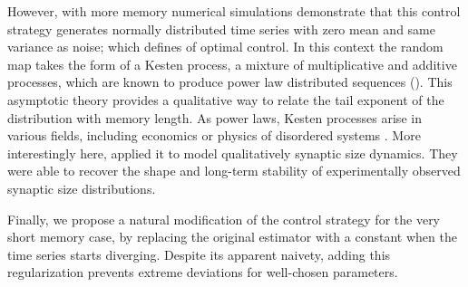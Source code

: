\documentclass[FinalReport.tex]{subfiles}
\begin{document}
However, with more memory numerical simulations demonstrate that this control strategy generates normally distributed time series with zero mean and same variance as noise; which defines of optimal control. In this context the random map takes the form of a Kesten process, a mixture of multiplicative and additive processes, which are known to produce power law distributed sequences (\citet{kesten}). This asymptotic theory provides a qualitative way to relate the tail exponent of the distribution with memory length. As power laws, Kesten processes arise in various fields, including economics \cite{kesten-econ} or physics of disordered systems \cite{kesten-process-physics}. More interestingly here, \citet{kesten-synapses} applied it to model qualitatively synaptic size dynamics. They were able to recover the shape and long-term stability of experimentally observed synaptic size distributions. 


Finally, we propose a natural modification of the control strategy for the very short memory case, by replacing the original estimator with a constant when the time series starts diverging. Despite its apparent naivety, adding this regularization prevents extreme deviations for well-chosen parameters.
\begin{comment}

The guiding idea is to study the nature of the control methodology, and the dependence of the results on the length of the time series on which the control is learned. In particular,  the emerging power-​laws can be seen to be structurally similar to the denominator of the random variable at the origin of the introduction of the student t distribution. We want to test the conjecture that the effects found by Eurich and Pawelzik (2005) and Patzelt et al may in fact disappear in certain very relevant conditions that will be explained to the student.
	
\end{comment}


  
\end{document}
